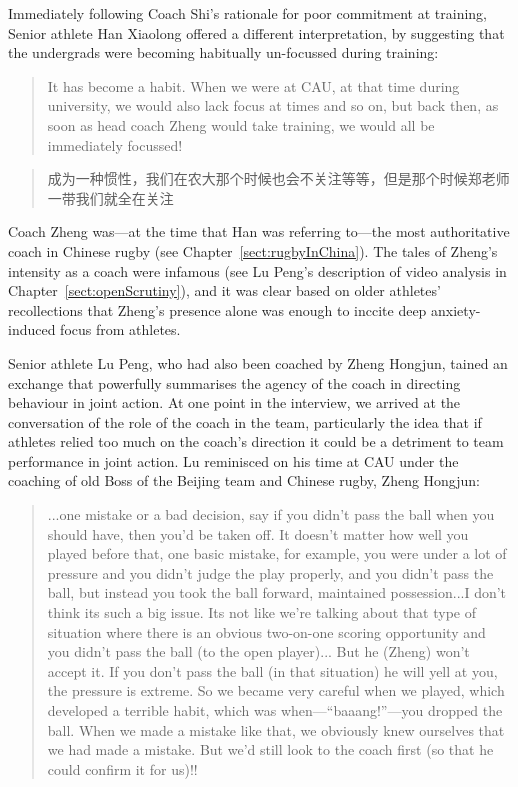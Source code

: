 \begin{CJK}{UTF8}{gbsn}
Immediately following Coach Shi's rationale for poor commitment at training, Senior athlete Han Xiaolong offered a different interpretation, by suggesting that the undergrads were becoming habitually un-focussed during training:
     \begin{quote}
       It has become a habit.  When we were at CAU, at that time during university, we would also lack focus at times and so on, but back then, as soon as head coach Zheng would take training, we would all be immediately focussed!
      \end{quote}
      \begin{quote}
       成为一种惯性，我们在农大那个时候也会不关注等等，但是那个时候郑老师一带我们就全在关注
      \end{quote}
Coach Zheng was---at the time that Han was referring to---the most authoritative coach in Chinese rugby (see Chapter~\ref{sect:rugbyInChina}). The tales of Zheng's intensity as a coach were infamous (see Lu Peng's description of video analysis in Chapter~\ref{sect:openScrutiny}), and it was clear based on older athletes' recollections that Zheng's presence alone was enough to inccite deep anxiety-induced focus from athletes.

Senior athlete Lu Peng, who had also been coached by Zheng Hongjun, tained an exchange that powerfully summarises the agency of the coach in directing behaviour in joint action.  At one point in the interview, we arrived at the conversation of the role of the coach in the team, particularly the idea that if athletes relied too much on the coach's direction it could be a detriment to team performance in joint action.  Lu reminisced on his time at CAU under the coaching of old Boss of the Beijing team and Chinese rugby, Zheng Hongjun:

  \begin{quote}
     ...one mistake or a bad decision, say if you didn't pass the ball when you should have, then you'd be taken off.  It doesn't matter how well you played before that, one basic mistake, for example, you were under a lot of pressure and you didn't judge the play properly, and you didn't pass the ball, but instead you took the ball forward, maintained possession...I don't think its such a big issue.
     Its not like we're talking about that type of situation where there is an obvious two-on-one scoring opportunity and you didn't pass the ball (to the open player)...
     But he (Zheng) won't accept it.  If you don't pass the ball (in that situation) he will yell at you, the pressure is extreme.  So we became very careful when we played, which developed a terrible habit, which was when---``baaang!''---you dropped the ball. When we made a mistake like that, we obviously knew ourselves that we had made a mistake.  But we'd still look to the coach first (so that he could confirm it for us)!!
               \end{quote}


\end{CJK}

